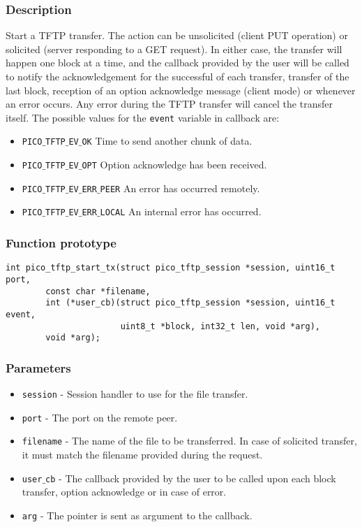 \subsubsection*{Description}
Start a TFTP transfer. The action can be unsolicited (client PUT operation) or solicited (server responding to a GET request).
In either case, the transfer will happen one block at a time, and the callback provided by the user will be called to notify the acknowledgement for the successful of each transfer, transfer of the last block, reception of an option acknowledge message (client mode) or whenever an error occurs. Any error during the TFTP transfer will cancel the transfer itself.
The possible values for the \texttt{event} variable in callback are:
\begin{itemize}[noitemsep]
\item \texttt{PICO$\_$TFTP$\_$EV$\_$OK} Time to send another chunk of data.
\item \texttt{PICO$\_$TFTP$\_$EV$\_$OPT} Option acknowledge has been received.
\item \texttt{PICO$\_$TFTP$\_$EV$\_$ERR$\_$PEER} An error has occurred remotely.
\item \texttt{PICO$\_$TFTP$\_$EV$\_$ERR$\_$LOCAL} An internal error has occurred.
\end{itemize}

\subsubsection*{Function prototype}
\begin{verbatim}
int pico_tftp_start_tx(struct pico_tftp_session *session, uint16_t port,
        const char *filename,
        int (*user_cb)(struct pico_tftp_session *session, uint16_t event,
                       uint8_t *block, int32_t len, void *arg),
        void *arg);
\end{verbatim}

\subsubsection*{Parameters}
\begin{itemize}[noitemsep]
\item \texttt{session} - Session handler to use for the file transfer.
\item \texttt{port} - The port on the remote peer.
\item \texttt{filename} - The name of the file to be transferred. In case of solicited transfer, it must match the filename provided during the request.
\item \texttt{user$\_$cb} - The callback provided by the user to be called upon each block transfer, option acknowledge or in case of error.
\item \texttt{arg} - The pointer is sent as argument to the callback.
\end{itemize}

